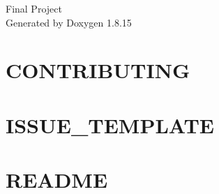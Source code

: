 \let\mypdfximage\pdfximage\def\pdfximage{\immediate\mypdfximage}\documentclass[twoside]{book}
\newcommand{\+}{\discretionary{\mbox{\scriptsize$\hookleftarrow$}}{}{}}
\newcommand{\clearemptydoublepage}{%
  \newpage{\pagestyle{empty}\cleardoublepage}%
}
\begin{document}
\hypersetup{pageanchor=false,
             bookmarksnumbered=true,
             pdfencoding=unicode
            }
\begin{titlepage}
\vspace*{7cm}
\begin{center}%
{\Large Final Project }\\
\vspace*{1cm}
{\large Generated by Doxygen 1.8.15}\\
\end{center}
\end{titlepage}
\clearemptydoublepage
{}
\tableofcontents
\clearemptydoublepage
{}
\hypersetup{pageanchor=true}

\chapter{C\+O\+N\+T\+R\+I\+B\+U\+T\+I\+NG}
\label{md__c_1__users__riley__nolan__desktop__school__spring_2019__c_s4850_git_finalproject-bluesentine52a21ae42db034d390a3e174c419aa05}

\chapter{I\+S\+S\+U\+E\+\_\+\+T\+E\+M\+P\+L\+A\+TE}
\label{md__c_1__users__riley__nolan__desktop__school__spring_2019__c_s4850_git_finalproject-bluesentinefc8a011b8e5cef79d8c32d3d71d7dc79}

\chapter{R\+E\+A\+D\+ME}
\label{md__c_1__users__riley__nolan__desktop__school__spring_2019__c_s4850_git_finalproject-bluesentine40c4e349d8f2ee50c7c9b54647ab2fb9}

\end{document}
